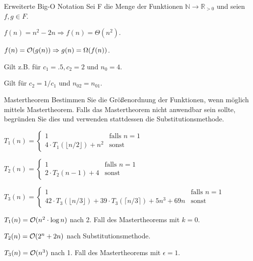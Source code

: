 \documentclass{exercisesheet}
\begin{document}
\begin{eexercises}{Erweiterte Big-O Notation}{
    Sei F die Menge der Funktionen $\mathbb{N} \rightarrow \mathbb{R}_{>0}$ und seien $f, g \in F$.
  }
  \item $f(n)=n^2-2n \Rightarrow f(n)=\Theta(n^2)$.
  \item $f(n)=\mathcal{O}(g(n)) \Rightarrow g(n)=\Omega(f(n))$.
\end{eexercises}

\begin{solutions}
  \item Gilt z.B. für $c_1=.5, c_2=2$ und $n_0=4$.
  \item Gilt für $c_2=1/c_1$ und $n_{02}=n_{01}$.
\end{solutions}

\begin{eexercises}{Mastertheorem}{
    Bestimmen Sie die Größenordnung der Funktionen, wenn möglich mittels Mastertheorem. Falls das Mastertheorem nicht anwendbar sein sollte, begründen Sie dies und verwenden stattdessen die Substitutionsmethode.
  }
  \item $T_1(n) = \begin{cases}
      1                                      & \text{falls } n = 1 \\
      4 \cdot T_1(\lfloor n/2 \rfloor) + n^2 & \text{sonst}
    \end{cases}$
  \item $T_2(n) = \begin{cases}
      1                    & \text{falls } n = 1 \\
      2 \cdot T_2(n-1) + 4 & \text{sonst}
    \end{cases}$
  \item $T_3(n) = \begin{cases}
      1                                                                                & \text{falls } n = 1 \\
      42 \cdot T_3(\lfloor n/3 \rfloor) + 39 \cdot T_3(\lceil n/3 \rceil) + 5n^3 + 69n & \text{sonst}
    \end{cases}$
\end{eexercises}

\begin{solutions}
  \item $T_1(n) = \mathcal{O}(n^2\cdot \log{n})$ nach 2. Fall des Mastertheorems mit $k=0$.
  \item $T_2(n) = \mathcal{O}(2^n+2n)$ nach Substitutionsmethode.
  \item $T_3(n) = \mathcal{O}(n^3)$ nach 1. Fall des Mastertheorems mit $\epsilon=1$.
\end{solutions}
\end{document}
